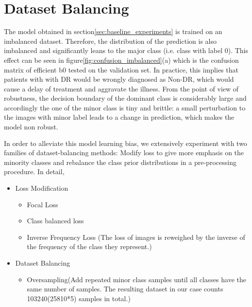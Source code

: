 \documentclass[../main.tex]{subfiles}
\begin{document}
\section{Dataset Balancing}
The model obtained in section\ref{sec:baseline_experiments} is trained on an imbalanced dataset. Therefore, the distribution of the prediction is also imbalanced and significantly leans to the major class (i.e. class with label 0). This effect can be seen in figure\ref{fig:confusion_imbalanced}(a) which is the confusion matrix of efficient b0 tested on the validation set. In practice, this implies that patients with with DR would be wrongly diagnosed as Non-DR, which would cause a delay of treatment and aggravate the illness. From the point of view of robustness, the decision boundary of the dominant class  is considerably large and accordingly the one of the minor class is tiny and brittle: a small perturbation to the images with minor label leads to a change in prediction, which makes the model non robust. 

In order to alleviate this model learning bias, we extensively experiment with two families of dataset-balancing methods: Modify loss to give more emphasis on the minority classes and rebalance the class prior distributions in a pre-processing procedure. In detail, 
\begin{itemize}
\item{Loss Modification}
\begin{itemize}
\item Focal Loss\cite{lin_focal_2018}
\item Class balanced loss\cite{cui_class-balanced_2019}
\item Inverse Frequency Loss (The loss of images is reweighed by the inverse of the frequency of the class they represent.)
\end{itemize}
\item{Dataset Balancing}
\begin{itemize}
\item Oversampling(Add repeated minor class samples until all classes have the same number of samples. The resulting dataset in our case counts 103240(25810*5) samples in total.)
\end{itemize}
\end{itemize}
\end{document}
